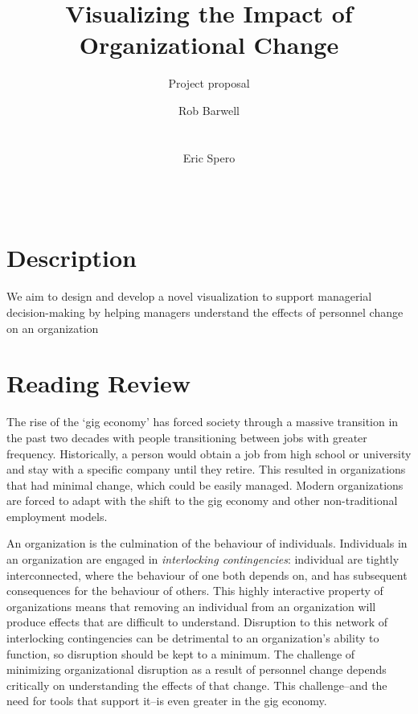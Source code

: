 \documentclass{soups}
\title{Visualizing the Impact of Organizational Change}
\subtitle{Project proposal}
\author{
\alignauthor
Rob Barwell\\ %
       \affaddr{Carleton University}\\
       \affaddr{Ottawa, Canada}\\
       \email{rob@barwell.ca}
\alignauthor
Eric Spero\\ %
       \affaddr{Carleton University}\\
       \affaddr{Ottawa, Canada }\\
       \email{eric.spero@carleton.ca}
}
\begin{document}
\nobalance

\makeatletter
\def\@copyrightspace{\relax}
\makeatother

\maketitle

\section{Description}

We aim to design and develop a novel visualization to support managerial decision-making by helping managers understand the effects of personnel change on an organization

\section{Reading Review}

The rise of the \lq gig economy\rq{}\cite{de2015rise,friedman2014workers} has forced society through a massive transition in the past two decades with people transitioning between jobs with greater frequency.  Historically, a person would obtain a job from high school or university and stay with a specific company until they retire.  This resulted in organizations that had minimal change, which could be easily managed. Modern organizations are forced to adapt with the shift to the gig economy and other non-traditional employment models.  

An organization is the culmination of the behaviour of individuals. Individuals in an organization are engaged in \emph{interlocking contingencies}\cite{glenn2006complexity}: individual are tightly interconnected, where the behaviour of one both depends on, and has subsequent consequences for the behaviour of others\cite{glenn2006complexity}. This highly interactive property of organizations means that removing an individual from an organization will produce effects that are difficult to understand. Disruption to this network of interlocking contingencies can be detrimental to an organization's ability to function, so disruption should be kept to a minimum. The challenge of minimizing organizational disruption as a result of personnel change depends critically on understanding the effects of that change. This challenge--and the need for tools that support it--is even greater in the gig economy. 
\end{document}
